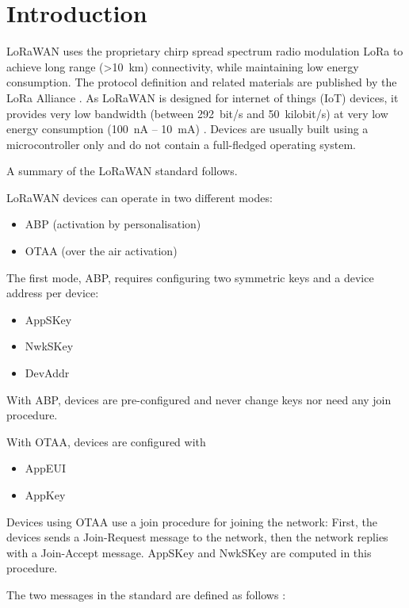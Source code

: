 \chapter{Introduction}

LoRaWAN uses the proprietary chirp spread spectrum radio modulation
LoRa to achieve long range (\textgreater{}10~km) connectivity, while
maintaining low energy consumption. The protocol definition and related materials are published by the LoRa Alliance \cite{spec}.
As LoRaWAN is designed for internet of things (IoT)
devices, it provides very low bandwidth (between 292~bit/s and 50~kilobit/s) at very low energy consumption (100~nA -- 10~mA) \cite{wiki_de_lorawan}. Devices are
usually built using a microcontroller only and do not contain a
full-fledged operating system.

A summary of the LoRaWAN standard \cite{spec} follows.

LoRaWAN devices can operate in two different modes:

\begin{itemize}
\tightlist
\item
  {ABP (activation by personalisation)}
\item
  {OTAA (over the air activation)}
\end{itemize}

{The first mode, ABP, requires configuring two symmetric keys and a
device address per device:}

\begin{itemize}
\tightlist
\item
  {AppSKey}
\item
  {NwkSKey}
\item
  {DevAddr}
\end{itemize}

{With ABP, devices are pre-configured and never change keys nor need any
join procedure.}


{With OTAA, devices are configured with}

\begin{itemize}
\tightlist
\item
  {AppEUI}
\item
  {AppKey}
\end{itemize}

{Devices using OTAA use a join procedure for joining the network: First,
the devices sends a Join-Request message to the network, then the network replies
with a Join-Accept message. AppSKey and NwkSKey are computed in this
procedure.}

{The two messages in the standard are defined as follows \cite{spec}:}

